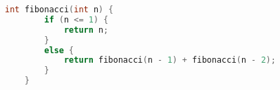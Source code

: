 \begin{lstlisting}[language=C++]
    int fibonacci(int n) {
        if (n <= 1) {
            return n;
        }
        else {
            return fibonacci(n - 1) + fibonacci(n - 2);
        }
    }
        \end{lstlisting}